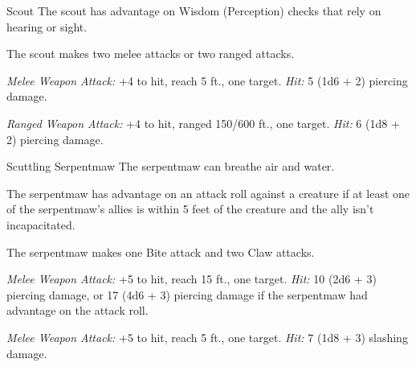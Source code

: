 \documentclass[10pt,a4paper,twoside,fancy,bg=print,twocolumn,openany,nodeprecatedcode]{dndbook}
\begin{document}
\begin{DndMonster}[float=t]{Scout}
\DndMonsterBasics[
armor-class = {13 (\textit{leather armor})},
hit-points = {\DndDice{3d8 + 3}},
speed = {30 ft.}
]
\DndMonsterAbilityScores[
 str = 11,
 dex = 14,
 con = 12,
 int = 11,
 wis = 13,
 cha = 11
]
\DndMonsterDetails[
skills = {Nature +4, Perception +5, Stealth +6, Survival +5},
languages = {any one language (usually Common)},
challenge = 1/2,
]
The scout has advantage on Wisdom (Perception) checks that rely on hearing or sight.

The scout makes two melee attacks or two ranged attacks.

\textsl{Melee Weapon Attack:} +4 to hit, reach 5 ft., one target. \textsl{Hit:} 5 (1d6 + 2) piercing damage.

\textsl{Ranged Weapon Attack:} +4 to hit, ranged 150/600 ft., one target. \textsl{Hit:} 6 (1d8 + 2) piercing damage.

\end{DndMonster}



\begin{DndMonster}[float=t]{Scuttling Serpentmaw}
\DndMonsterBasics[
armor-class = {17 (natural armor)},
hit-points = {\DndDice{10d6 + 30}},
speed = {30 ft.}
]
\DndMonsterAbilityScores[
 str = 16,
 dex = 14,
 con = 16,
 int = 3,
 wis = 11,
 cha = 3
]
\DndMonsterDetails[
skills = {Stealth +6},
senses = {blindsight 60 ft. (blind beyond this radius), passive perception 10},
challenge = 4,
]
The serpentmaw can breathe air and water.

The serpentmaw has advantage on an attack roll against a creature if at least one of the serpentmaw's allies is within 5 feet of the creature and the ally isn't incapacitated.

The serpentmaw makes one Bite attack and two Claw attacks.

\textsl{Melee Weapon Attack:} +5 to hit, reach 15 ft., one target. \textsl{Hit:} 10 (2d6 + 3) piercing damage, or 17 (4d6 + 3) piercing damage if the serpentmaw had advantage on the attack roll.

\textsl{Melee Weapon Attack:} +5 to hit, reach 5 ft., one target. \textsl{Hit:} 7 (1d8 + 3) slashing damage.

\end{DndMonster}
\end{document}
